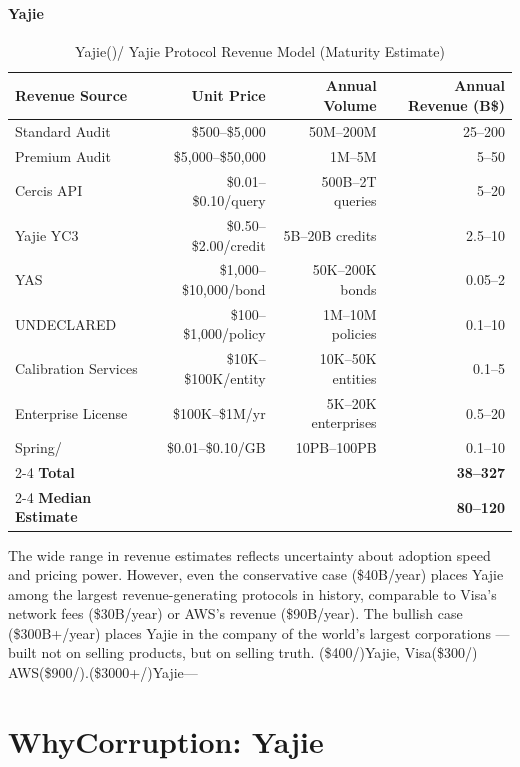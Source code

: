 \documentclass[12pt,a4paper]{article}
\theoremstyle{remark}
\begin{document}
\subsection{Yajie}
\label{sec:econ_surplus}
\begin{table}[H]
\centering
\caption{Yajie()/ Yajie Protocol Revenue Model (Maturity Estimate)}
\label{tab:revenue}
\begin{tabular}{@{}lrrr@{}}
\toprule
\textbf{ Revenue Source} & \textbf{ Unit Price} & \textbf{ Annual Volume} & \textbf{ Annual Revenue (B\$)} \\
\midrule
 Standard Audit & \$500--\$5,000 & 50M--200M & 25--200 \\
 Premium Audit & \$5,000--\$50,000 & 1M--5M & 5--50 \\
Cercis API & \$0.01--\$0.10/query & 500B--2T queries & 5--20 \\
Yajie YC3 & \$0.50--\$2.00/credit & 5B--20B credits & 2.5--10 \\
YAS & \$1,000--\$10,000/bond & 50K--200K bonds & 0.05--2 \\
UNDECLARED & \$100--\$1,000/policy & 1M--10M policies & 0.1--10 \\
 Calibration Services & \$10K--\$100K/entity & 10K--50K entities & 0.1--5 \\
 Enterprise License & \$100K--\$1M/yr & 5K--20K enterprises & 0.5--20 \\
Spring/ & \$0.01--\$0.10/GB & 10PB--100PB & 0.1--10 \\
\cmidrule{2-4}
\textbf{ Total} & & & \textbf{38--327} \\
\cmidrule{2-4}
\textbf{ Median Estimate} & & & \textbf{80--120} \\
\bottomrule
\end{tabular}
\end{table}
The wide range in revenue estimates reflects uncertainty about adoption speed and pricing 
power. However, even the conservative case (\$40B/year) places Yajie among the largest 
revenue-generating protocols in history, comparable to Visa's network fees (\$30B/year) 
or AWS's revenue (\$90B/year). The bullish case (\$300B+/year) places Yajie in the 
company of the world's largest corporations --- built not on selling products, but on 
selling truth.
\medskip
(\$400/)Yajie, Visa(\$300/)
AWS(\$900/).(\$3000+/)Yajie---
\part{WhyCorruption: Yajie}
\end{document}
